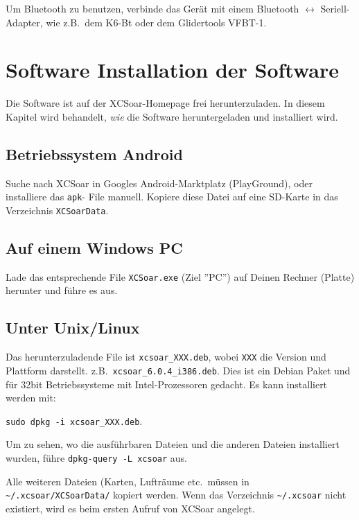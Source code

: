 Um Bluetooth zu benutzen, verbinde das Gerät mit einem Bluetooth $\leftrightarrow$ Seriell-Adapter, wie z.B.\ 
 dem K6-Bt oder dem Glidertools VFBT-1.


\section{Software Installation der Software}

Die Software ist auf der {\textsf  XCSoar}-Homepage frei herunterzuladen. 
In diesem Kapitel wird behandelt, {\sl wie} die Software heruntergeladen und installiert wird.

\subsection*{Betriebssystem Android}

Suche nach {\textsf  XCSoar} in Googles Android-Marktplatz (PlayGround), oder installiere das \verb|apk|-
File manuell.  Kopiere diese Datei auf eine SD-Karte in das Verzeichnis \verb|XCSoarData|.

\subsection*{Auf einem Windows PC}
  
Lade das entsprechende File \verb|XCSoar.exe| (Ziel ''PC'') auf Deinen Rechner (Platte) herunter und führe es aus.


\subsection*{Unter Unix/Linux}

Das herunterzuladende File ist \verb|xcsoar_XXX.deb|, wobei \verb|XXX| die Version und Plattform darstellt.  
z.B.\ \verb|xcsoar_6.0.4_i386.deb|. Dies ist ein Debian Paket und für 32bit Betriebssysteme mit Intel-Prozessoren gedacht.
Es kann installiert werden mit:
\begin{center}
\verb|sudo dpkg -i xcsoar_XXX.deb|.
\end{center}
Um zu sehen, wo die ausführbaren Dateien und die anderen Dateien installiert wurden, führe \verb|dpkg-query -L xcsoar| 
aus. 

Alle weiteren Dateien (Karten, Lufträume etc.\ müssen in \verb|~/.xcsoar/XCSoarData/| kopiert werden.
Wenn das Verzeichnis \verb|~/.xcsoar| nicht existiert, wird es beim ersten Aufruf von {\textsf  XCSoar} angelegt.


